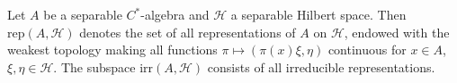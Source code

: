 Let $A$ be a separable $C^*$-algebra and $\mathcal{H}$ a separable Hilbert space. Then $\text{rep}(A, \mathcal{H})$ denotes the set of all representations of $A$ on $\mathcal{H}$, endowed with the weakest topology making all functions $\pi \mapsto (\pi(x)\xi, \eta)$ continuous for $x \in A$, $\xi, \eta \in \mathcal{H}$. The subspace $\text{irr}(A, \mathcal{H})$ consists of all irreducible representations.
